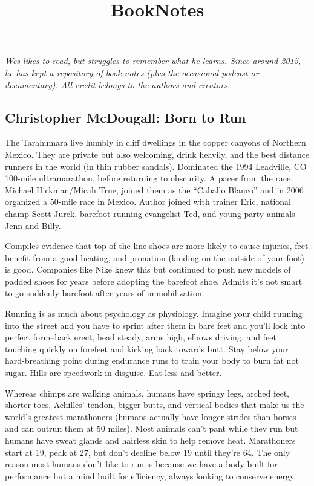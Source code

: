 \documentclass[
]{article}
\title{BookNotes}
\author{}
\date{\vspace{-2.5em}}
\begin{document}
\maketitle

{
\setcounter{tocdepth}{2}
\tableofcontents
}
\emph{Wes likes to read, but struggles to remember what he learns. Since
around 2015, he has kept a repository of book notes (plus the occasional
podcast or documentary). All credit belongs to the authors and
creators.}

\hypertarget{christopher-mcdougall-born-to-run}{%
\subsection{Christopher McDougall: Born to
Run}\label{christopher-mcdougall-born-to-run}}

The Tarahumara live humbly in cliff dwellings in the copper canyons of
Northern Mexico. They are private but also welcoming, drink heavily, and
the best distance runners in the world (in thin rubber sandals).
Dominated the 1994 Leadville, CO 100-mile ultramarathon, before
returning to obscurity. A pacer from the race, Michael Hickman/Micah
True, joined them as the ``Caballo Blanco'' and in 2006 organized a
50-mile race in Mexico. Author joined with trainer Eric, national champ
Scott Jurek, barefoot running evangelist Ted, and young party animals
Jenn and Billy.

Compiles evidence that top-of-the-line shoes are more likely to cause
injuries, feet benefit from a good beating, and pronation (landing on
the outside of your foot) is good. Companies like Nike knew this but
continued to push new models of padded shoes for years before adopting
the barefoot shoe. Admits it's not smart to go suddenly barefoot after
years of immobilization.

Running is as much about psychology as physiology. Imagine your child
running into the street and you have to sprint after them in bare feet
and you'll lock into perfect form--back erect, head steady, arms high,
elbows driving, and feet touching quickly on forefeet and kicking back
towards butt. Stay below your hard-breathing point during endurance runs
to train your body to burn fat not sugar. Hills are speedwork in
disguise. Eat less and better.

Whereas chimps are walking animals, humans have springy legs, arched
feet, shorter toes, Achilles' tendon, bigger butts, and vertical bodies
that make us the world's greatest marathoners (humans actually have
longer strides than horses and can outrun them at 50 miles). Most
animals can't pant while they run but humans have sweat glands and
hairless skin to help remove heat. Marathoners start at 19, peak at 27,
but don't decline below 19 until they're 64. The only reason most humans
don't like to run is because we have a body built for performance but a
mind built for efficiency, always looking to conserve energy.
\end{document}
